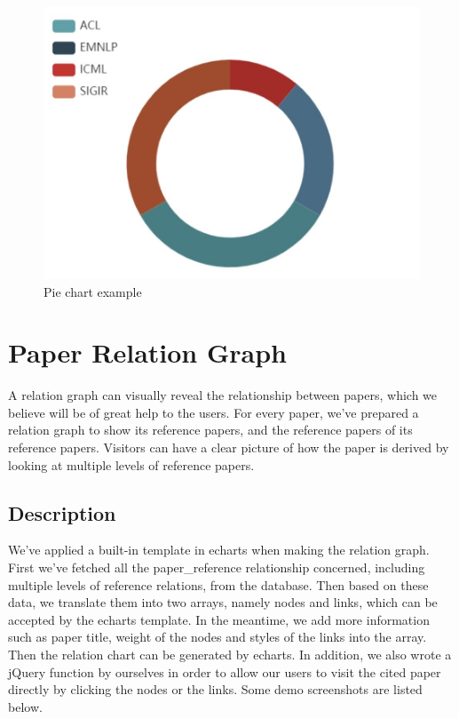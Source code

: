 \documentclass{book}
\begin{document}
\begin{figure}[H]
\centering
\includegraphics[scale=0.7]{img/fsh_pie.jpg}
\caption{Pie chart example}
\end{figure}



\section {Paper Relation Graph}

A relation graph can visually reveal the relationship between papers, which we believe will be of great help to the users. For every paper, we've prepared a relation graph to show its reference papers, and the reference papers of its reference papers. Visitors can have a clear picture of how the paper is derived by looking at multiple levels of reference papers.

\subsection{Description}

We've applied a built-in template in echarts when making the relation graph. First we've fetched all the paper\_reference relationship concerned, including multiple levels of reference relations, from the database. Then based on these data, we translate them into two arrays, namely nodes and links, which can be accepted by the echarts template. In the meantime, we add more information such as paper title, weight of the nodes and styles of the links into the array. Then the relation chart can be generated by echarts. In addition, we also wrote a jQuery function by ourselves in order to allow our users to visit the cited paper directly by clicking the nodes or the links. Some demo screenshots are listed below.
\end{document}
